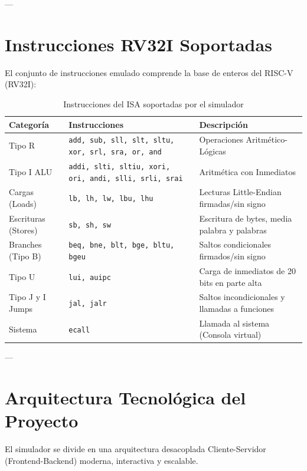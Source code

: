 \documentclass[12pt,letterpaper]{article}
\begin{document}
---

\section{Instrucciones RV32I Soportadas}
El conjunto de instrucciones emulado comprende la base de enteros del RISC-V (RV32I):

\begin{table}[H]
\centering
\caption{Instrucciones del ISA soportadas por el simulador}
\begin{tabular}{lll}
\toprule
\textbf{Categoría} & \textbf{Instrucciones} & \textbf{Descripción} \\
\midrule
Tipo R & \texttt{add, sub, sll, slt, sltu, xor, srl, sra, or, and} & Operaciones Aritmético-Lógicas \\
Tipo I ALU & \texttt{addi, slti, sltiu, xori, ori, andi, slli, srli, srai} & Aritmética con Inmediatos \\
Cargas (Loads) & \texttt{lb, lh, lw, lbu, lhu} & Lecturas Little-Endian firmadas/sin signo \\
Escrituras (Stores) & \texttt{sb, sh, sw} & Escritura de bytes, media palabra y palabras \\
Branches (Tipo B) & \texttt{beq, bne, blt, bge, bltu, bgeu} & Saltos condicionales firmados/sin signo \\
Tipo U & \texttt{lui, auipc} & Carga de inmediatos de 20 bits en parte alta \\
Tipo J y I Jumps & \texttt{jal, jalr} & Saltos incondicionales y llamadas a funciones \\
Sistema & \texttt{ecall} & Llamada al sistema (Consola virtual) \\
\bottomrule
\end{tabular}
\end{table}

---

\section{Arquitectura Tecnológica del Proyecto}

El simulador se divide en una arquitectura desacoplada Cliente-Servidor (Frontend-Backend) moderna, interactiva y escalable.
\end{document}
